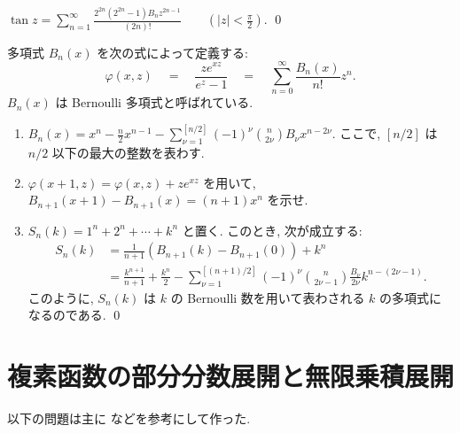 \documentclass[12pt,twoside]{jarticle}
\begin{document}
\begin{question}
  \(
    \displaystyle
    \tan z
    = \sum_{n=1}^\infty \frac{2^{2n}(2^{2n}-1)B_nz^{2n-1}}{(2n)!}
    \qquad \left( |z| < \frac{\pi}{2} \right).
  \)
  \qed
\end{question}

\begin{question}
  多項式 $B_n(x)$ を次の式によって定義する:
  \[
    \varphi(x,z)
    \quad = \quad
    \frac{z e^{xz}}{e^z - 1}
    \quad = \quad 
    \sum_{n=0}^{\infty}\frac{B_n(x)}{n!}z^n.
  \]
  $B_n(x)$ は Bernoulli 多項式と呼ばれている. 
  \begin{enumerate}
  \item
    \(
    \displaystyle
      B_n(x)
      = 
      x^n - \frac{n}{2}x^{n-1}
      - \sum_{\nu=1}^{[n/2]} (-1)^\nu {n \choose 2\nu} B_\nu x^{n-2\nu}
    \).
    ここで, $[n/2]$ は $n/2$ 以下の最大の整数を表わす.
  \item
    \(
      \varphi(x+1,z) = \varphi(x,z) + z e^{xz}
    \)
    を用いて, 
    \(
      B_{n+1}(x+1) - B_{n+1}(x) = (n + 1) x^n
    \)
    を示せ.
  \item 
    \(
      S_n(k) = 1^n + 2^n + \cdots + k^n
    \)
    と置く. このとき, 次が成立する:
    \begin{align*}
      S_n(k) 
      & =
      \frac{1}{n+1}\left( B_{n+1}(k) - B_{n+1}(0) \right) + k^n
      \\
      & =
      \frac{k^{n+1}}{n+1} + \frac{k^n}{2}
      - \sum_{\nu=1}^{[(n+1)/2]}
        (-1)^\nu {n \choose 2\nu-1} \frac{B_\nu}{2\nu} k^{n-(2\nu-1)}.
    \end{align*}
    このように, $S_n(k)$ は $k$ の Bernoulli 数を用いて表わされる $k$ 
    の多項式になるのである. \qed
  \end{enumerate}
\end{question}


\section{複素函数の部分分数展開と無限乗積展開}

以下の問題は主に \cite{kaiseki-gairon} などを参考にして作った.
\end{document}
